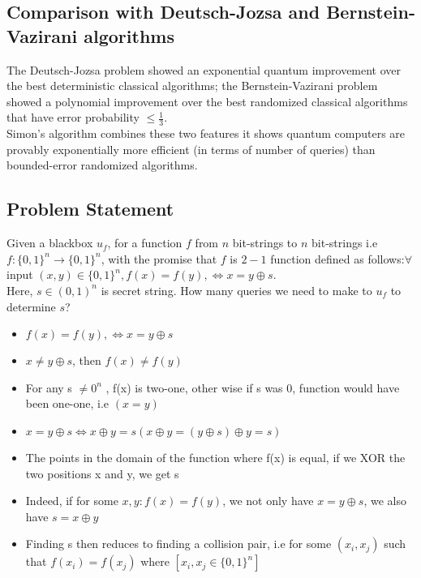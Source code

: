 \documentclass[11.5pt, paper=a4]{article}
\theoremstyle{definition}
\numberwithin{theorem}{section}
\begin{document}
\subsection{Comparison with Deutsch-Jozsa and Bernstein-Vazirani algorithms}
The Deutsch-Jozsa problem showed an exponential quantum improvement over the best deterministic classical algorithms; the Bernstein-Vazirani problem showed a polynomial improvement over the best randomized classical algorithms that have error probability $\leqslant \frac{1}{3}$.\\ [2mm] 
Simon's algorithm combines these two features it shows quantum computers are provably exponentially more efficient (in terms of number of queries) than bounded-error randomized algorithms.
\subsection{Problem Statement}
Given a blackbox $u_f$, for a function $f$ from $n$ bit-strings to $n$ bit-strings i.e $f:\{0,1\}^n\rightarrow \{0,1\}^n$, with the promise that $f$ is $2-1$ function defined as follows:$\forall$ input $(x,y)\in \{0,1\}^n, f(x) = f(y), \iff x=y\oplus s$. \\ [2mm]
Here, $s\in (0,1)^n$ is secret string. How many queries we need to make to $u_f$ to determine $s$?
\begin{itemize}
  \item $f(x) = f(y), \iff x=y\oplus s$
  \item $x\neq y\oplus s$, then $f(x) \neq f(y)$
  \item For any s $\neq 0^n$ , f(x) is two-one, other wise if s was 0, function would have been one-one, i.e $(x=y)$
  \item $x=y\oplus s \iff x \oplus y = s (x \oplus y = (y \oplus s) \oplus y = s) $
  \item The points in the domain of the function where f(x) is equal, if we XOR the two positions x and y, we get s
  \item Indeed, if for some $x,y : f(x) = f(y)$, we not only have $x=y\oplus s$, we also have $s = x \oplus y$
  \item Finding s then reduces to finding a collision pair, i.e for some $(x_i, x_j)$ such that $f(x_i) = f(x_j)$ where $[x_i, x_j \in \{0,1\}^n]$
\end{itemize}
\end{document}
